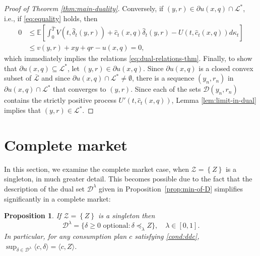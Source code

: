 \documentclass[11pt, oneside]{article}   	%
\theoremstyle{plain}
\newtheorem{prop}[thm]{Proposition}
\theoremstyle{definition}
\theoremstyle{remark}
\begin{document}
\begin{proof}[Proof of Theorem \ref{thm:main-duality}]
Conversely, if $(y,r)\in\partial u(x,q)\cap\mathcal{L}^*$, i.e., if \eqref{eq:equality} holds, then
\begin{align*}
0&\leq\mathbb{E}\left[\int_0^{\hat{T}} V(t,\hat{\delta}_t(y,r))+\hat{c}_t(x,q)\hat{\delta}_t(y,r)-U(t,\hat{c}_t(x,q))d\kappa_t\right]\\
&\leq v(y,r)+xy+qr-u(x,q)=0,
\end{align*}
which immediately implies the relations \eqref{eq:dual-relations-thm}.
Finally, to show that $\partial u(x,q)\subseteq\mathcal{L}^*$, let $(y,r)\in\partial u(x,q)$. Since $\partial u(x,q)$ is a closed convex subset of $\bar{\mathcal{L}}$ and since $\partial u(x,q)\cap\mathcal{L}^*\neq\emptyset$, there is a sequence $(y_n,r_n)$ in $\partial u(x,q)\cap\mathcal{L}^*$ that converges to $(y,r)$. Since each of the sets $\mathcal{D}(y_n,r_n)$ contains the strictly positive process $U'(t,\hat{c}_t(x,q))$, Lemma \ref{lem:limit-in-dual} implies that $(y,r)\in\mathcal{L}^*$.
\end{proof}



\section{Complete market}\label{sec:complete}

In this section, we examine the complete market case, when $\mathcal{Z}=\left\{ Z \right\}$ is a singleton, in much greater detail. This becomes possible due to the fact that the description of the dual set $\mathcal{D}^\lambda$ given in Proposition~\ref{prop:min-of-D} simplifies significantly in a complete market:

\begin{prop}\label{prop:complete-case-D}
If $\mathcal{Z}=\left\{ Z \right\}$ is a singleton then
\begin{equation}\label{eq:description-D-complete}
\mathcal{D}^\lambda=\{\delta\geq 0\text{ optional}: \delta\preceq_\lambda Z\},\quad \lambda\in[0,1].
\end{equation}
In particular, for any consumption plan $c$ satisfying \eqref{cond:ddc}, $\sup_{\delta\in\mathcal{D}^\lambda}\langle c,\delta \rangle=\langle c,Z \rangle$.
\end{prop}
\end{document}

